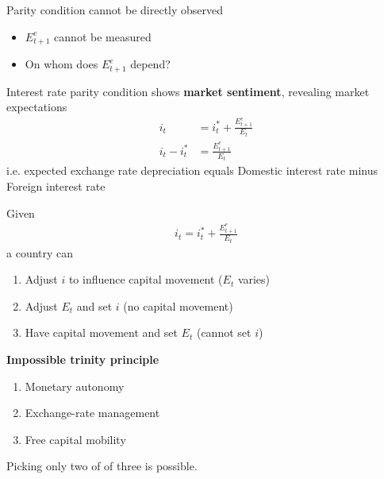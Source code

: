 \documentclass{beamer}
\begin{document}
\begin{frame}
  Parity condition cannot be directly observed
  \begin{itemize}
    \item $E^e_{t+1}$ cannot be measured
    \item On whom does $E^e_{t+1}$ depend? 
  \end{itemize}  
 Interest rate parity condition shows \textbf{market sentiment}, revealing market expectations
  \begin{align}
      i_t &= i^*_t +  \frac{E^e_{t+1}}{E_t}\\ \nonumber
      i_t - i^*_t  &= \frac{E^e_{t+1}}{E_t}
  \end{align}
  i.e. expected exchange rate depreciation equals Domestic interest rate minus Foreign interest rate  
\end{frame}

\begin{frame}
  Given 
  \begin{align}
    i_t = i^*_t +  \frac{E^e_{t+1}}{E_t}
  \end{align}
   a country can 
  \begin{enumerate}
    \item Adjust $i$ to influence capital movement ($E_t$ varies)
    \item Adjust $E_t$ and set $i$ (no capital movement)
    \item Have capital movement and set $E_t$ (cannot set $i$)
  \end{enumerate}
\end{frame}

\begin{frame}
  \textbf{Impossible trinity principle}
  \begin{enumerate}
    \item Monetary autonomy
    \item Exchange-rate management
    \item Free capital mobility    
  \end{enumerate}
  \medskip
  Picking only two of of three is possible.
\end{frame}
\end{document}
